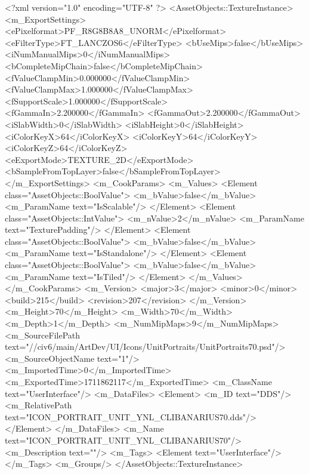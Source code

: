 <?xml version="1.0" encoding="UTF-8" ?>
<AssetObjects::TextureInstance>
	<m_ExportSettings>
		<ePixelformat>PF_R8G8B8A8_UNORM</ePixelformat>
		<eFilterType>FT_LANCZOS6</eFilterType>
		<bUseMips>false</bUseMips>
		<iNumManualMips>0</iNumManualMips>
		<bCompleteMipChain>false</bCompleteMipChain>
		<fValueClampMin>0.000000</fValueClampMin>
		<fValueClampMax>1.000000</fValueClampMax>
		<fSupportScale>1.000000</fSupportScale>
		<fGammaIn>2.200000</fGammaIn>
		<fGammaOut>2.200000</fGammaOut>
		<iSlabWidth>0</iSlabWidth>
		<iSlabHeight>0</iSlabHeight>
		<iColorKeyX>64</iColorKeyX>
		<iColorKeyY>64</iColorKeyY>
		<iColorKeyZ>64</iColorKeyZ>
		<eExportMode>TEXTURE_2D</eExportMode>
		<bSampleFromTopLayer>false</bSampleFromTopLayer>
	</m_ExportSettings>
	<m_CookParams>
		<m_Values>
			<Element class="AssetObjects::BoolValue">
				<m_bValue>false</m_bValue>
				<m_ParamName text="IsScalable"/>
			</Element>
			<Element class="AssetObjects::IntValue">
				<m_nValue>2</m_nValue>
				<m_ParamName text="TexturePadding"/>
			</Element>
			<Element class="AssetObjects::BoolValue">
				<m_bValue>false</m_bValue>
				<m_ParamName text="IsStandalone"/>
			</Element>
			<Element class="AssetObjects::BoolValue">
				<m_bValue>false</m_bValue>
				<m_ParamName text="IsTiled"/>
			</Element>
		</m_Values>
	</m_CookParams>
	<m_Version>
		<major>3</major>
		<minor>0</minor>
		<build>215</build>
		<revision>207</revision>
	</m_Version>
	<m_Height>70</m_Height>
	<m_Width>70</m_Width>
	<m_Depth>1</m_Depth>
	<m_NumMipMaps>9</m_NumMipMaps>
	<m_SourceFilePath text="//civ6/main/ArtDev/UI/Icons/UnitPortraits/UnitPortraits70.psd"/>
	<m_SourceObjectName text="1"/>
	<m_ImportedTime>0</m_ImportedTime>
	<m_ExportedTime>1711862117</m_ExportedTime>
	<m_ClassName text="UserInterface"/>
	<m_DataFiles>
		<Element>
			<m_ID text="DDS"/>
			<m_RelativePath text="ICON_PORTRAIT_UNIT_YNL_CLIBANARIUS70.dds"/>
		</Element>
	</m_DataFiles>
	<m_Name text="ICON_PORTRAIT_UNIT_YNL_CLIBANARIUS70"/>
	<m_Description text=""/>
	<m_Tags>
		<Element text="UserInterface"/>
	</m_Tags>
	<m_Groups/>
</AssetObjects::TextureInstance>

 